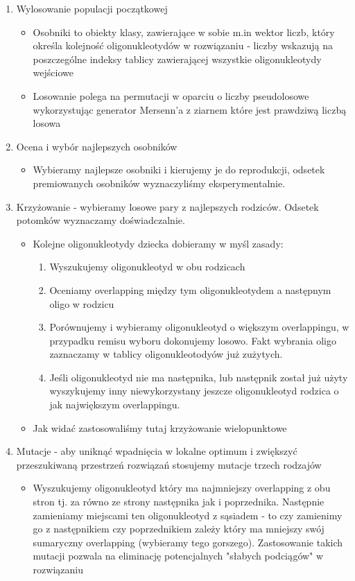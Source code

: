 \documentclass{article}
\begin{document}
\begin{enumerate}
\item Wylosowanie populacji początkowej
\begin{itemize}
\item Osobniki to obiekty klasy, zawierające w sobie m.in wektor liczb, który określa kolejność oligonukleotydów w rozwiązaniu - liczby wskazują na poszczególne indeksy tablicy zawierającej wszystkie oligonukleotydy wejściowe
\item Losowanie polega na permutacji w oparciu o liczby pseudolosowe wykorzystując generator Mersenn'a z ziarnem które jest prawdziwą liczbą losowa
\end{itemize}
\item Ocena i wybór najlepszych osobników
\begin{itemize}
\item Wybieramy najlepsze osobniki i kierujemy je do reprodukcji, odsetek premiowanych osobników wyznaczyliśmy eksperymentalnie.
\end{itemize}
\item Krzyżowanie - wybieramy losowe pary z najlepszych rodziców. Odsetek potomków wyznaczamy doświadczalnie.
\begin{itemize}
\item Kolejne oligonukleotydy dziecka dobieramy w myśl zasady:
\begin{enumerate}
\item Wyszukujemy oligonukleotyd w obu rodzicach
\item Oceniamy overlapping między tym oligonukleotydem a następnym oligo w rodzicu
\item Porównujemy i wybieramy oligonukleotyd o większym overlappingu, w przypadku remisu wyboru dokonujemy losowo. Fakt wybrania oligo zaznaczamy w tablicy oligonukleotodyów już zużytych.
\item Jeśli oligonukleotyd nie ma następnika, lub następnik został już użyty wyszykujemy inny niewykorzystany jeszcze oligonukleotyd rodzica o jak największym overlappingu.
\end{enumerate}
\item Jak widać zastosowaliśmy tutaj krzyżowanie wielopunktowe
\end{itemize}
\item Mutacje - aby uniknąć wpadnięcia w lokalne optimum i zwiększyć przeszukiwaną przestrzeń rozwiązań stosujemy mutacje trzech rodzajów
\begin{itemize}
\item Wyszukujemy oligonukleotyd który ma najmniejszy overlapping z obu stron tj. za równo ze strony następnika jak i poprzednika. Następnie zamieniamy miejscami ten oligonukleotyd z sąsiadem - to czy zamienimy go z następnikiem czy poprzednikiem zależy który ma mniejszy swój sumaryczny overlapping (wybieramy tego gorszego). Zastosowanie takich mutacji pozwala na eliminację potencjalnych "słabych podciągów" w rozwiązaniu

\end{itemize}
\end{enumerate}
\end{document}
